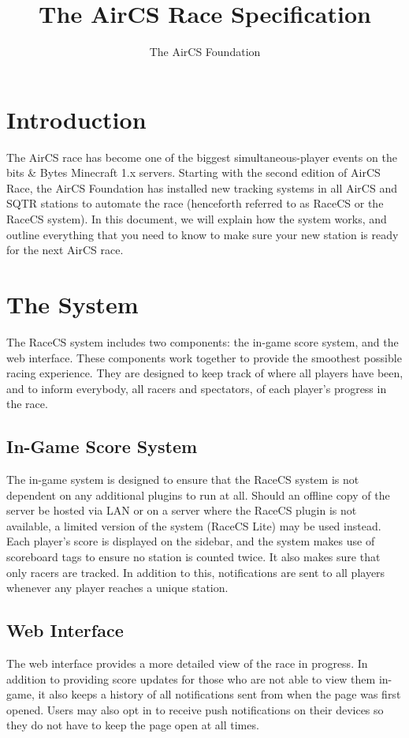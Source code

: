 \documentclass{article}
\title{The \textbf{{\color{red}Air}CS} Race Specification}
\author{The AirCS Foundation}
\begin{document}
\maketitle
\tableofcontents

\section{Introduction}
The AirCS race has become one of the biggest simultaneous-player events on the bits \& Bytes Minecraft 1.x servers. Starting with the second edition of AirCS Race, the AirCS Foundation has installed new tracking systems in all AirCS and SQTR stations to automate the race (henceforth referred to as RaceCS or the RaceCS system). In this document, we will explain how the system works, and outline everything that you need to know to make sure your new station is ready for the next AirCS race.

\pagebreak

\section{The System}
The RaceCS system includes two components: the in-game score system, and the web interface. These components work together to provide the smoothest possible racing experience. They are designed to keep track of where all players have been, and to inform everybody, all racers and spectators, of each player's progress in the race.

\subsection{In-Game Score System}
The in-game system is designed to ensure that the RaceCS system is not dependent on any additional plugins to run at all. Should an offline copy of the server be hosted via LAN or on a server where the RaceCS plugin is not available, a limited version of the system (RaceCS Lite) may be used instead. Each player's score is displayed on the sidebar, and the system makes use of scoreboard tags to ensure no station is counted twice. It also makes sure that only racers are tracked. In addition to this, notifications are sent to all players whenever any player reaches a unique station.

\subsection{Web Interface}
The web interface provides a more detailed view of the race in progress. In addition to providing score updates for those who are not able to view them in-game, it also keeps a history of all notifications sent from when the page was first opened. Users may also opt in to receive push notifications on their devices so they do not have to keep the page open at all times.
\end{document}
